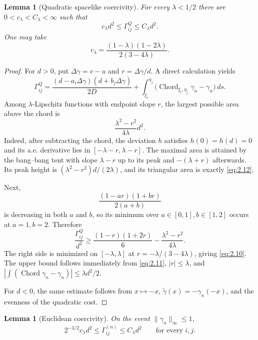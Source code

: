 \documentclass[11pt,reqno]{amsart}
\newtheorem{lemma}[theorem]{Lemma}
\theoremstyle{definition}
\theoremstyle{remark}
\numberwithin{equation}{section}
\begin{document}
\begin{lemma}[Quadratic spacelike coercivity]
\label{lem:quad}
For every \(\lambda<1/2\) there are
\(0<c_\lambda<C_\lambda<\infty\) such that
\begin{equation}
c_\lambda d^2\le \Gamma^Q_{ij}\le C_\lambda d^2.
\label{eq:2.9}
\end{equation}
One may take
\begin{equation}
c_\lambda=
\frac{(1-\lambda)(1-2\lambda)}{2(3-4\lambda)}.
\label{eq:2.10}
\end{equation}
\end{lemma}

\begin{proof}
For \(d>0\), put \(\Delta\gamma=v-u\) and \(r=\Delta\gamma/d\).
A direct calculation yields
\begin{equation}
\Gamma^Q_{ij}
=
\frac{(d-a_i\Delta\gamma)(d+b_j\Delta\gamma)}{2D}
+
\int_{\xi_i}^{\eta_j}
\bigl(\operatorname{Chord}_{\xi_i,\eta_j}\gamma_n-\gamma_n\bigr)\,ds.
\label{eq:2.11}
\end{equation}
Among \(\lambda\)-Lipschitz functions with endpoint slope \(r\), the
largest possible area above the chord is
\begin{equation}
\frac{\lambda^2-r^2}{4\lambda}d^2.
\label{eq:2.12}
\end{equation}
Indeed, after subtracting the chord, the deviation \(h\) satisfies
\(h(0)=h(d)=0\) and its a.e. derivative lies in
\([-\lambda-r,\lambda-r]\).  The maximal area is attained by the
bang--bang tent with slope \(\lambda-r\) up to its peak and
\(-(\lambda+r)\) afterwards.  Its peak height is
\((\lambda^2-r^2)d/(2\lambda)\), and its triangular area is exactly
\eqref{eq:2.12}.

Next,
\[
\frac{(1-a r)(1+b r)}{2(a+b)}
\]
is decreasing in both \(a\) and \(b\), so its minimum over
\(a\in[0,1], b\in[1,2]\) occurs at \(a=1,b=2\).
Therefore
\[
\frac{\Gamma^Q_{ij}}{d^2}
\ge
\frac{(1-r)(1+2r)}6
-\frac{\lambda^2-r^2}{4\lambda}.
\]
The right side is minimized on \([-\lambda,\lambda]\) at
\(r=-\lambda/(3-4\lambda)\), giving \eqref{eq:2.10}.  The upper bound follows
immediately from \eqref{eq:2.11}, \(|r|\le\lambda\), and
\(|\int(\operatorname{Chord}\gamma_n-\gamma_n)|\le \lambda d^2/2\).

For \(d<0\), the same estimate follows from
\(x\mapsto-x\), \(\widetilde\gamma(x)=-\gamma_n(-x)\), and the evenness
of the quadratic cost.
\end{proof}

\begin{lemma}[Euclidean coercivity]
\label{lem:euclid-coerc}
On the event \(\|\gamma_n\|_\infty\le1\),
\begin{equation}
2^{-3/2}c_\lambda d^2
\le
\Gamma^{(n)}_{ij}
\le
C_\lambda d^2
\qquad\text{for every }i,j.
\label{eq:2.13}
\end{equation}
\end{lemma}
\end{document}
